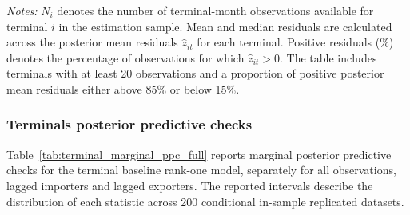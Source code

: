 \documentclass[pdftex,12pt,openright,a4paper,oneside]{book}
\begin{document}
\begin{table}[htbp]
\vspace{0.2cm}
\begin{minipage}{0.95\textwidth}
\footnotesize
\textit{Notes:} $N_i$ denotes the number of terminal-month observations available for terminal $i$ in the estimation sample. Mean and median residuals are calculated across the posterior mean residuals $\widehat{z}_{it}$ for each terminal. Positive residuals (\%) denotes the percentage of observations for which $\widehat{z}_{it}>0$. The table includes terminals with at least 20 observations and a proportion of positive posterior mean residuals either above 85\% or below 15\%.
\end{minipage}
\end{table}

\subsubsection{Terminals posterior predictive checks}
\label{app:terminal_ppc}

Table~\ref{tab:terminal_marginal_ppc_full} reports marginal posterior predictive checks for the terminal baseline rank-one model, separately for all observations, lagged importers and lagged exporters. The reported intervals describe the distribution of each statistic across 200 conditional in-sample replicated datasets.
\end{document}
